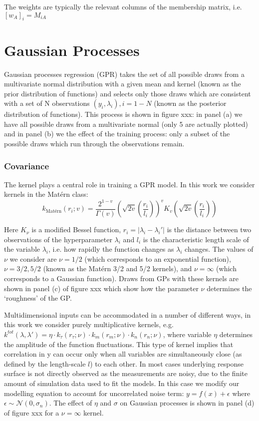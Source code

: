 The weights are typically the relevant columns of the membership matrix, i.e. $\left[w_{A}\right]_{i}=M_{i A}$

\section{Gaussian Processes}

Gaussian processes regression (GPR) takes the set of all possible draws from a multivariate normal distribution with a given mean and kernel (known as the prior distribution of functions) and selects only those draws which are consistent with a set of N observations $(y_i,\lambda_i ),i=1-N$ (known as the posterior distribution of functions). This process is shown in figure xxx: in panel (a) we have all possible draws from a multivariate normal (only 5 are actually plotted) and in panel (b) we the effect of the training process: only a subset of the possible draws which run through the observations remain. 

\subsubsection{Covariance}
The kernel plays a central role in training a GPR model. In this work we consider kernels in the Mat{\'e}rn class: 
\begin{equation}
k_{\text {Mat{\'e}rn}}\left(r_{i} ; v\right)=\frac{2^{1-v}}{\Gamma(v)}\left(\sqrt{2 v}\left(\frac{r_{i}}{l_{i}}\right)\right)^{v} K_{v}\left(\sqrt{2 v}\left(\frac{r_{i}}{l_{i}}\right)\right)
\end{equation}

Here $K_{\nu}$ is a modified Bessel function, $r_i=|\lambda_i-\lambda_i'|$ is the distance between two observations of the hyperparameter $\lambda_i$ and $l_i$ is the characteristic length scale of the variable $\lambda_i$, i.e. how rapidly the function changes as $\lambda_i$ changes. The values of $\nu$ we consider are $\nu=1/2$ (which corresponds to an exponential function), $\nu=3/2,5/2$ (known as the Matérn 3/2 and 5/2 kernels), and $\nu=\infty$ (which corresponds to a Gaussian function). Draws from GPs with these kernels are shown in panel (c) of figure xxx which show how the parameter $\nu$ determines the ‘roughness’ of the GP. 

Multidimensional inputs can be accommodated in a number of different ways, in this work we consider purely multiplicative kernels, e.g. $k^{tot}(\lambda,\lambda')=\eta\cdot k_{\tau} (r_{\tau};\nu)\cdot k_m (r_m;\nu)\cdot k_n (r_n;\nu)$, where variable $\eta$ determines the amplitude of the function fluctuations. This type of kernel implies that correlation in y can occur only when all variables are simultaneously close (as defined by the length-scale $l$) to each other. In most cases underlying response surface is not directly observed as the measurements are noisy, due to the finite amount of simulation data used to fit the models. In this case we modify our modelling equation to account for uncorrelated noise term: $y=f(x)+\epsilon$ where $\epsilon  \sim \mathcal{N}(0,\sigma_{n} )$. The effect of $\eta$ and $\sigma$ on Gaussian processes is shown in panel (d) of figure xxx for a $\nu = \infty$ kernel. 

